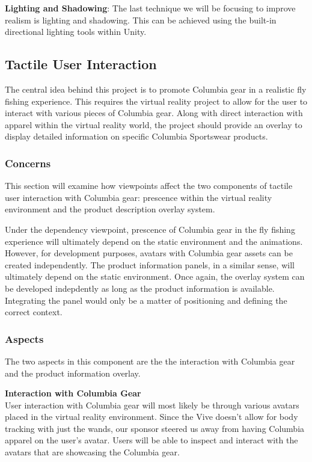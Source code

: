 \documentclass[10pt,journal,compsoc,onecolumn, draftclsnofoot]{IEEEtran}
\begin{document}
\hangindent=0.5cm \textbf{Lighting and Shadowing}: The last technique we will be focusing to improve realism is lighting and shadowing. This can be achieved using the built-in directional lighting tools within Unity. \\

\subsection{Tactile User Interaction}
The central idea behind this project is to promote Columbia gear in a realistic fly fishing experience. This requires the virtual reality project to allow for the user to interact with various pieces of Columbia gear. Along with direct interaction with apparel within the virtual reality world, the project should provide an overlay to display detailed information on specific Columbia Sportswear products.

\subsubsection{Concerns}
This section will examine how viewpoints affect the two components of tactile user interaction with Columbia gear: prescence within the virtual reality environment and the product description overlay system.

Under the dependency viewpoint, prescence of Columbia gear in the fly fishing experience will ultimately depend on the static environment and the animations. However, for development purposes, avatars with Columbia gear assets can be created independently. The product information panels, in a similar sense, will ultimately depend on the static environment. Once again, the overlay system can be developed indepdently as long as the product information is available. Integrating the panel would only be a matter of positioning and defining the correct context.

\subsubsection{Aspects}
The two aspects in this component are the the interaction with Columbia gear and the product information overlay.

\hangindent=0.5cm \textbf{Interaction with Columbia Gear} \\
User interaction with Columbia gear will most likely be through various avatars placed in the virtual reality environment. Since the Vive doesn't allow for body tracking with just the wands, our sponsor steered us away from having Columbia apparel on the user's avatar. Users will be able to inspect and interact with the avatars that are showcasing the Columbia gear.
\end{document}
